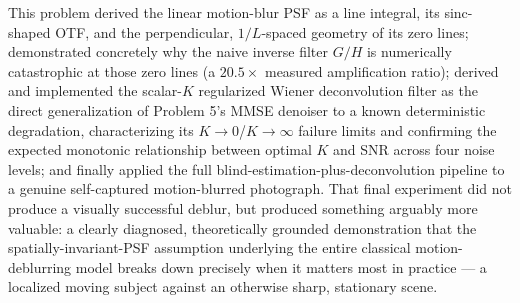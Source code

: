 \documentclass[11pt]{article}
\begin{document}
This problem derived the linear motion-blur PSF as a line integral, its sinc-shaped OTF, and the
perpendicular, $1/L$-spaced geometry of its zero lines; demonstrated concretely why the naive
inverse filter $G/H$ is numerically catastrophic at those zero lines (a $20.5\times$ measured
amplification ratio); derived and implemented the scalar-$K$ regularized Wiener deconvolution
filter as the direct generalization of Problem 5's MMSE denoiser to a known deterministic
degradation, characterizing its $K\to0$/$K\to\infty$ failure limits and confirming the expected
monotonic relationship between optimal $K$ and SNR across four noise levels; and finally applied
the full blind-estimation-plus-deconvolution pipeline to a genuine self-captured motion-blurred
photograph. That final experiment did not produce a visually successful deblur, but produced
something arguably more valuable: a clearly diagnosed, theoretically grounded demonstration that
the spatially-invariant-PSF assumption underlying the entire classical motion-deblurring model
breaks down precisely when it matters most in practice — a localized moving subject against an
otherwise sharp, stationary scene.
\end{document}
